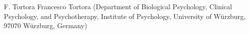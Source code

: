 
                {F.  Tortora}
                {Francesco Tortora (Department of Biological Psychology, Clinical Psychology, and Psychotherapy, Institute of Psychology, University of Würzburg, 97070 Würzburg, Germany)}
                